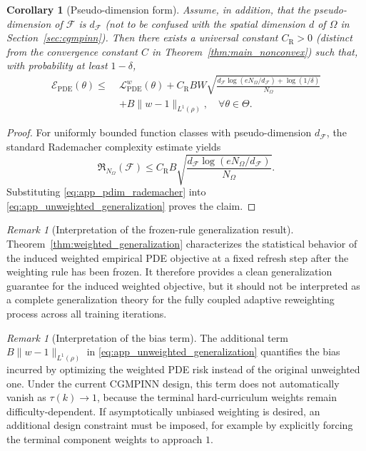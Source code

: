 \documentclass{article}
\theoremstyle{plain}
\newtheorem{corollary}[theorem]{Corollary}
\theoremstyle{definition}
\theoremstyle{remark}
\newtheorem{remark}[theorem]{Remark}
\begin{document}
\begin{corollary}[Pseudo-dimension form]
	\label{cor:pdim_bound}
	Assume, in addition, that the pseudo-dimension of $\mathcal{F}$ is
	$d_{\mathcal{F}}$ (not to be confused with the spatial dimension $d$
	of $\Omega$ in Section~\ref{sec:cgmpinn}).
	Then there exists a universal constant $C_{\mathrm{R}}>0$
	(distinct from the convergence constant $C$ in
	Theorem~\ref{thm:main_nonconvex}) such that, with probability
	at least $1-\delta$,
	\begin{equation}
		\begin{aligned}
			\mathcal{E}_{\mathrm{PDE}}(\theta)
			\leqslant\;&
			\mathcal{L}_{\mathrm{PDE}}^{w}(\theta)
			+
			C_{\mathrm{R}}BW
			\sqrt{
				\frac{
					d_{\mathcal{F}}\log(eN_{\Omega}/d_{\mathcal{F}})+\log(1/\delta)
				}{
					N_{\Omega}
				}
			} \\
			&+
			B\|w-1\|_{L^1(\rho)},
			\quad
			\forall \theta\in\Theta.
		\end{aligned}
		\label{eq:app_pdim_bound}
	\end{equation}
\end{corollary}

\begin{proof}
	For uniformly bounded function classes with pseudo-dimension
	$d_{\mathcal{F}}$, the standard Rademacher complexity estimate yields
	\begin{equation}
		\mathfrak{R}_{N_{\Omega}}(\mathcal{F})
		\leqslant
		C_{\mathrm{R}}B
		\sqrt{
			\frac{
				d_{\mathcal{F}}\log(eN_{\Omega}/d_{\mathcal{F}})
			}{
				N_{\Omega}
			}
		}.
		\label{eq:app_pdim_rademacher}
	\end{equation}
	Substituting \eqref{eq:app_pdim_rademacher} into
	\eqref{eq:app_unweighted_generalization} proves the claim.
\end{proof}

\begin{remark}[Interpretation of the frozen-rule generalization result]
	\label{rem:frozen_rule_scope}
	Theorem~\ref{thm:weighted_generalization} characterizes the statistical
	behavior of the induced weighted empirical PDE objective at a fixed
	refresh step after the weighting rule has been frozen.
	It therefore provides a clean generalization guarantee for the induced
	weighted objective, but it should not be interpreted as a complete
	generalization theory for the fully coupled adaptive reweighting process
	across all training iterations.
\end{remark}

\begin{remark}[Interpretation of the bias term]
	\label{rem:bias_term}
	The additional term
	$B\|w-1\|_{L^1(\rho)}$
	in \eqref{eq:app_unweighted_generalization} quantifies the bias
	incurred by optimizing the weighted PDE risk instead of the original
	unweighted one.
	Under the current CGMPINN design, this term does not automatically
	vanish as $\tau(k)\to 1$, because the terminal hard-curriculum weights
	remain difficulty-dependent.
	If asymptotically unbiased weighting is desired, an additional design
	constraint must be imposed, for example by explicitly forcing the
	terminal component weights to approach $1$.
\end{remark}
\end{document}
